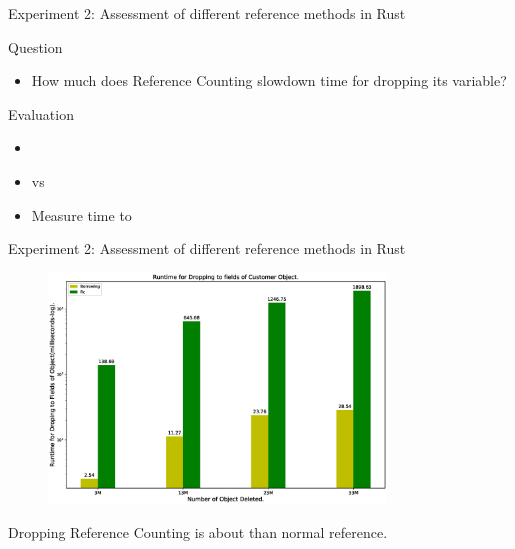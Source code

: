\documentclass[9pt]{beamer}
\begin{document}

\begin{frame}[fragile]{Experiment 2: Assessment of different reference methods in Rust}

    Question
    \begin{itemize}
        \item How much does Reference Counting slowdown time for dropping its variable?
    \end{itemize}

    Evaluation
    \begin{itemize}
        \item {}
        \item {} vs 
        \item Measure time to 
    \end{itemize}

\end{frame}



\begin{frame}[fragile]{Experiment 2: Assessment of different reference methods in Rust}

    \begin{figure}[hp]
        \centering
        \begin{center}
                \includegraphics[width=0.8\textwidth]{images/rust_droptime_borring_rc.eps}
                \captionsetup{labelformat=empty}
        \end{center}
    \end{figure}
    Dropping Reference Counting is about  than normal reference.
\end{frame}
\end{document}
